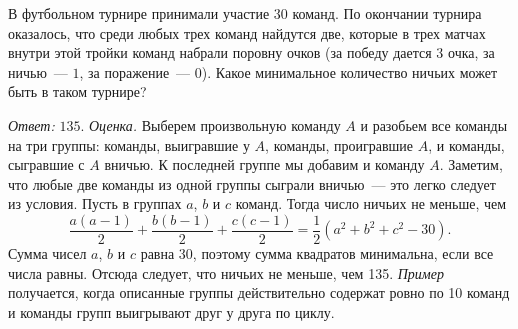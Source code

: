 \problem
В футбольном турнире принимали участие $30$ команд.
По окончании турнира оказалось, что среди любых трех команд найдутся две,
которые в трех матчах внутри этой тройки команд набрали поровну очков
(за победу дается $3$ очка, за ничью~--- $1$, за поражение~--- $0$).
Какое минимальное количество ничьих может быть в таком турнире?

\solution
\emph{Ответ:} $135$.
\emph{Оценка.}
Выберем произвольную команду $A$ и разобьем все команды на три группы:
команды, выигравшие у $A$, команды, проигравшие $A$, и команды, сыгравшие с
$A$ вничью.
К последней группе мы добавим и команду $A$.
Заметим, что любые две команды из одной группы сыграли вничью~--- это легко
следует из условия.
Пусть в группах $a$, $b$ и $c$ команд.
Тогда число ничьих не меньше, чем
\[
    \dfrac{a (a - 1)}{2} +
    \dfrac{b (b - 1)}{2} +
    \dfrac{c (c - 1)}{2}
=
    \dfrac{1}{2}(a^2 + b^2 + c^2 - 30)
.\]
Сумма чисел $a$, $b$ и $c$ равна 30, поэтому сумма квадратов минимальна, если
все числа равны.
Отсюда следует, что ничьих не меньше, чем 135.
\emph{Пример} получается, когда описанные группы действительно содержат ровно по 10
команд и команды групп выигрывают друг у друга по циклу.

\endproblem
